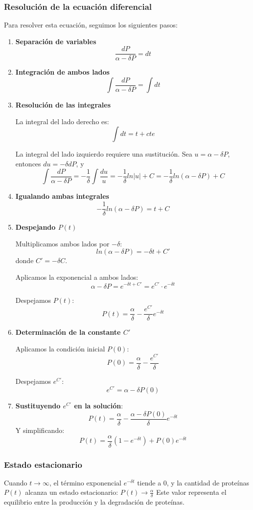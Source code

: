 \subsubsection{Resolución de la ecuación diferencial}
Para resolver esta ecuación, seguimos los siguientes pasos:
\begin{enumerate}
\item \textbf{Separación de variables}
$$\frac{dP}{\alpha - \delta P} = dt$$

\item \textbf{Integración de ambos lados}
$$\int \frac{dP}{\alpha - \delta P} = \int dt$$

\item \textbf{Resolución de las integrales}

La integral del lado derecho es:
$$\int dt = t + cte$$

La integral del lado izquierdo requiere una sustitución. Sea $u = \alpha - \delta P$, entonces $du = - \delta dP$, y
$$\int \frac{dP}{\alpha - \delta P} = - \frac{1}{\delta} \int \frac{du}{u} = -\frac{1}{\delta} ln |u| + C = -\frac{1}{\delta} ln(\alpha - \delta P) + C$$

\item \textbf{Igualando ambas integrales}
$$-\frac{1}{\delta} ln (\alpha - \delta P) = t + C$$

\item \textbf{Despejando $P(t)$}

Multiplicamos ambos lados por $-\delta$:
$$ln(\alpha - \delta P) = -\delta t + C'$$
donde $C' = -\delta C$.

Aplicamos la exponencial a ambos lados:
$$\alpha - \delta P = e^{-\delta t + C'} = e^{C'} \cdot e^{-\delta t}$$

Despejamos $P(t)$:
$$P(t) = \frac{\alpha}{\delta} - \frac{e^{C'}}{\delta} e^{-\delta t}$$

\item \textbf{Determinación de la constante $C'$}

Aplicamos la condición inicial $P(0)$:
$$P(0) = \frac{\alpha}{\delta} - \frac{e^{C'}}{\delta}$$

Despejamos $e^{C'}$:
$$e^{C'} = \alpha - \delta P(0)$$

\item \textbf{Sustituyendo $e^{C'}$ en la solución}:
$$P(t) = \frac{\alpha}{\delta} - \frac{\alpha - \delta P(0)}{\delta} e^{-\delta t}$$
Y simplificando:
$$P(t) = \frac{\alpha}{\delta} (1 - e^{-\delta t}) + P(0) e^{-\delta t}$$
\end{enumerate}

\subsubsection{Estado estacionario}
Cuando $t\rightarrow \infty$, el término exponencial $e^{-\delta t}$ tiende a 0, y la cantidad de proteínas $P(t)$ alcanza un estado estacionario:
$P(t) \rightarrow \frac{\alpha}{\delta}$
Este valor representa el equilibrio entre la producción y la degradación de proteínas.



